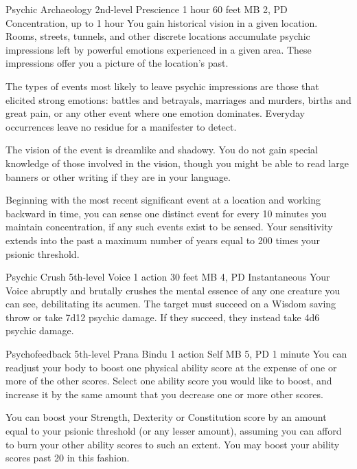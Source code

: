 \DndPowerHeader%
  {Psychic Archaeology}
  {2nd-level Prescience}
  {1 hour}
  {60 feet}
  {MB 2, PD \lvltwo}
  {Concentration, up to 1 hour}
  You gain historical vision in a given location.
  Rooms, streets, tunnels, and other discrete locations
  accumulate psychic impressions left by powerful emotions
  experienced in a given area.
  These impressions offer you a picture of the location's past.

  The types of events most likely to leave
  psychic impressions are those that elicited strong emotions:
  battles and betrayals,
  marriages and murders,
  births and great pain,
  or any other event where one emotion dominates.
  Everyday occurrences leave no residue for a manifester to detect.
  
  The vision of the event is dreamlike and shadowy.
  You do not gain special knowledge of those involved in the vision,
  though you might be able to read large banners
  or other writing if they are in your language.
  
  Beginning with the most recent significant event
  at a location and working backward in time,
  you can sense one distinct event for every 10 minutes
  you maintain concentration,
  if any such events exist to be sensed.
  Your sensitivity extends into the past
  a maximum number of years equal to
  200 times your psionic threshold.

\DndPowerHeader%
  {Psychic Crush}
  {5th-level Voice}
  {1 action}
  {30 feet}
  {MB 4, PD \lvlfive}
  {Instantaneous}
Your Voice abruptly and brutally crushes the mental essence
of any one creature you can see, debilitating its acumen.
The target must succeed on a Wisdom saving throw
or take 7d12 psychic damage.
If they succeed, they instead take 4d6 psychic damage.

\DndPowerHeader%
  {Psychofeedback}
  {5th-level Prana Bindu}
  {1 action}
  {Self}
  {MB 5, PD \lvlfive}
  {1 minute}
  You can readjust your body to boost one
  physical ability score at the expense of one
  or more of the other scores.
  Select one ability score you would like to boost,
  and increase it by the same amount that you decrease
  one or more other scores.

  You can boost your
  Strength, Dexterity or Constitution score by an
  amount equal to your psionic threshold
  (or any lesser amount),
  assuming you can afford to burn your other ability
  scores to such an extent.
  You may boost your ability scores past 20 in this fashion.
  
